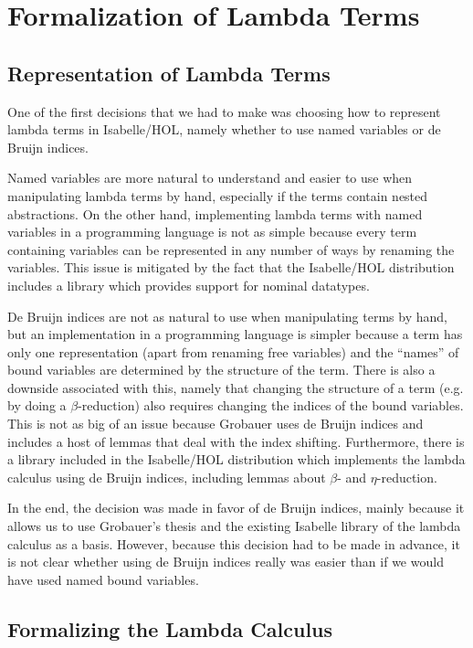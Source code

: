 \chapter{Formalization of Lambda Terms}
\label{ch:lam}

\section{Representation of Lambda Terms}
\label{sec:rep}

One of the first decisions that we had to make was choosing how to represent lambda terms in Isabelle/HOL, namely whether to use named variables or de Bruijn indices.

Named variables are more natural to understand and easier to use when manipulating lambda terms by hand, especially if the terms contain nested abstractions. On the other hand, implementing lambda terms with named variables in a programming language is not as simple because every term containing variables can be represented in any number of ways by renaming the variables. This issue is mitigated by the fact that the Isabelle/HOL distribution includes a library which provides support for nominal datatypes.

De Bruijn indices are not as natural to use when manipulating terms by hand, but an implementation in a programming language is simpler because a term has only one representation (apart from renaming free variables) and the ``names'' of bound variables are determined by the structure of the term. There is also a downside associated with this, namely that changing the structure of a term (e.g. by doing a $\beta$-reduction) also requires changing the indices of the bound variables. This is not as big of an issue because Grobauer \cite{Grobauer} uses de Bruijn indices and includes a host of lemmas that deal with the index shifting. Furthermore, there is a library included in the Isabelle/HOL distribution which implements the lambda calculus using de Bruijn indices, including lemmas about $\beta$- and $\eta$-reduction.

In the end, the decision was made in favor of de Bruijn indices, mainly because it allows us to use Grobauer's thesis \cite{Grobauer} and the existing Isabelle library of the lambda calculus as a basis. However, because this decision had to be made in advance, it is not clear whether using de Bruijn indices really was easier than if we would have used named bound variables.

\section{Formalizing the Lambda Calculus}

